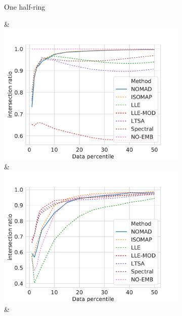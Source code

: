 \documentclass[twoside,11pt]{article}
\begin{document}
\begin{figure}
\begin{subfigure}{\textwidth}
\begin{footnotesize}
\begin{tabu}
    	\begin{sideways}
        	One half-ring
        \end{sideways} &
		\includegraphics[width=\linewidth]{figures/geodesics/geodesics_moons_orthogonal_noise000_label0} &
		\includegraphics[width=\linewidth]{figures/geodesics/geodesics_moons_orthogonal_noise005_label0} &

\end{tabu}
\end{footnotesize}
\end{subfigure}
\end{figure}
\end{document}
